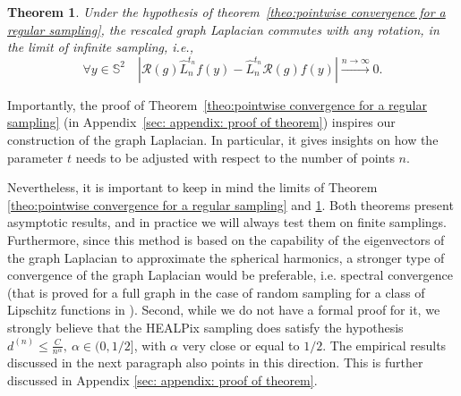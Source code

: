 \documentclass{article} %
\newtheorem{theorem}{Theorem}[section]
\newcommand{\todo}[1]{{\color[rgb]{.6,.1,.6}{#1}}}
\newcommand{\linefrac}[2]{
    {#1/#2}
}
\begin{document}
\begin{theorem}\label{theo:equivariance}
Under the hypothesis of theorem~\ref{theo:pointwise convergence for a regular sampling}, the rescaled graph Laplacian commutes with any rotation, in the limit of infinite sampling, i.e.,
\begin{equation*}
	\forall y\in\mathbb S^2\quad\left| \mathcal R(g) \hat L_n^{t_n} f (y) - \hat L_n^{t_n} \mathcal R(g) f(y) \right| \xrightarrow{n\to\infty}0.
\end{equation*}
\end{theorem}

Importantly, the proof of Theorem~\ref{theo:pointwise convergence for a regular sampling} (in Appendix~\ref{sec: appendix: proof of theorem}) inspires our construction of the graph Laplacian.
In particular, it gives insights on how the parameter $t$ needs to be adjusted with respect to the number of points $n$.

Nevertheless, it is important to keep in mind the limits of Theorem \ref{theo:pointwise convergence for a regular sampling} and \ref{theo:equivariance}. Both theorems present asymptotic results, and in practice we will always test them on finite samplings. Furthermore, since this method is based on the capability of the eigenvectors of the graph Laplacian to approximate the spherical harmonics, a stronger type of convergence of the graph Laplacian would be preferable, i.e. spectral convergence (that is proved for a full graph in the case of random sampling for a class of Lipschitz functions in \citep{belkin2007convergence}).
Second, while we do not have a formal proof for it, we strongly believe that the HEALPix sampling does satisfy the hypothesis $d^{(n)}\leq \frac{C}{n^\alpha}, \ \alpha\in (0,\linefrac{1}{2}]$, with $\alpha$ very close or equal to $\linefrac{1}{2}$.
The empirical results discussed in the next paragraph also points in this direction.
This is further discussed in Appendix \ref{sec: appendix: proof of theorem}.
\end{document}
